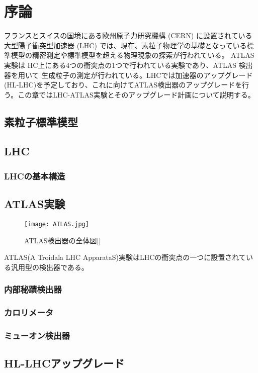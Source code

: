 \chapter{序論}

フランスとスイスの国境にある欧州原子力研究機構 (CERN) に設置されている大型陽子衝突型加速器 (LHC) では、現在、素粒子物理学の基礎となっている標準模型の精密測定や標準模型を超える物理現象の探索が行われている。 ATLAS実験は HC上にある4つの衝突点の1つで行われている実験であり、ATLAS 検出器を用いて 生成粒子の測定が行われている。LHCでは加速器のアップグレード(HL-LHC)を予定しており、これに向けてATLAS検出器のアップグレードを行う。この章ではLHC-ATLAS実験とそのアップグレード計画について説明する。


\section{素粒子標準模型}






\section{LHC}

\subsection{LHCの基本構造}






\section{ATLAS実験}
\begin{figure}[tbp]
  \centering
  \texttt{[image: ATLAS.jpg]}
  \caption[ATLAS検出器]{ATLAS検出器の全体図[\cite{ATLAS}]}
  \label{fig:ATLAS}
\end{figure}



ATLAS(A Troidala LHC ApparataS)実験はLHCの衝突点の一つに設置されている汎用型の検出器である。



\subsection{内部秘蹟検出器}

\subsection{カロリメータ}

\subsection{ミューオン検出器}









\section{HL-LHCアップグレード}



\newpage
